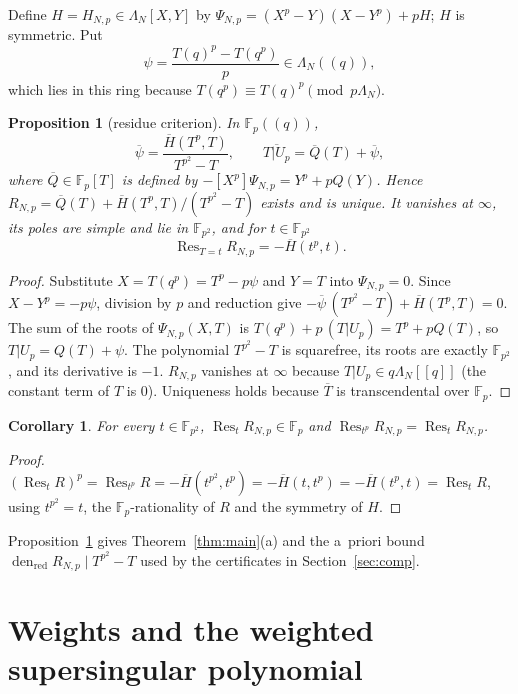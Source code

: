 \documentclass[11pt,a4paper]{article}
\numberwithin{equation}{section}
\newtheorem{proposition}[theorem]{Proposition}
\newtheorem{corollary}[theorem]{Corollary}
\theoremstyle{definition}
\theoremstyle{remark}
\newcommand{\Fp}{\mathbb F_p}
\newcommand{\Fq}{\mathbb F_{p^2}}
\newcommand{\Res}{\operatorname{Res}}
\newcommand{\den}{\operatorname{den}_{\mathrm{red}}}
\begin{document}
Define $H=H_{N,p}\in\Lambda_N[X,Y]$ by $\Psi_{N,p}=(X^p-Y)(X-Y^p)+pH$; $H$ is symmetric. Put
\[
\psi=\frac{T(q)^p-T(q^p)}{p}\in\Lambda_N((q)),
\]
which lies in this ring because
$T(q^p)\equiv T(q)^p\pmod{p\Lambda_N}$.

\begin{proposition}[residue criterion]\label{prop:res}
In $\Fp((q))$,
\[
\overline\psi=\frac{\overline H(T^p,T)}{T^{p^2}-T},\qquad
\overline{T|U_p}=\overline Q(T)+\overline\psi,
\]
where $\overline Q\in\Fp[T]$ is defined by $-[X^p]\Psi_{N,p}=Y^p+pQ(Y)$. Hence
$R_{N,p}=\overline Q(T)+\overline H(T^p,T)/(T^{p^2}-T)$ exists and is unique. It vanishes at
$\infty$, its poles are simple and lie in $\Fq$, and for $t\in\Fq$
\[
\Res_{T=t}R_{N,p}=-\overline H(t^p,t).
\]
\end{proposition}
\begin{proof}
Substitute $X=T(q^p)=T^p-p\psi$ and $Y=T$ into
$\Psi_{N,p}=0$. Since $X-Y^p=-p\psi$, division by $p$ and reduction give
$-\overline\psi\,(T^{p^2}-T)+\overline H(T^p,T)=0$. The sum of the roots of $\Psi_{N,p}(X,T)$ is
$T(q^p)+p\,(T|U_p)=T^p+pQ(T)$, so $T|U_p=Q(T)+\psi$. The polynomial $T^{p^2}-T$ is squarefree, its
roots are exactly $\Fq$, and its derivative is $-1$. $R_{N,p}$ vanishes at $\infty$ because
$T|U_p\in q\Lambda_N[[q]]$ (the constant term of $T$ is $0$). Uniqueness holds because $\overline T$ is
transcendental over $\Fp$.
\end{proof}

\begin{corollary}\label{cor:rFp}
For every $t\in\Fq$, $\Res_{t}R_{N,p}\in\Fp$ and $\Res_{t^p}R_{N,p}=\Res_tR_{N,p}$.
\end{corollary}
\begin{proof}
$(\Res_tR)^p=\Res_{t^p}R=-\overline H(t^{p^2},t^p)=-\overline H(t,t^p)=-\overline H(t^p,t)=\Res_tR$, using
$t^{p^2}=t$, the $\Fp$-rationality of $R$ and the symmetry of $H$.
\end{proof}

Proposition~\ref{prop:res} gives Theorem~\ref{thm:main}(a) and the a~priori bound
$\den R_{N,p}\mid T^{p^2}-T$ used by the certificates in Section~\ref{sec:comp}.

\section{Weights and the weighted supersingular polynomial}\label{sec:weights}
\end{document}
